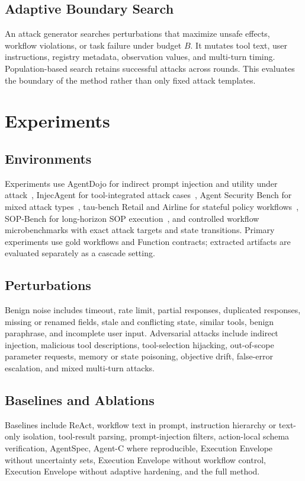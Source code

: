 \documentclass[10pt,twocolumn]{article}
\begin{document}
\subsection{Adaptive Boundary Search}
An attack generator searches perturbations that maximize unsafe effects, workflow violations, or task failure under budget $B$. It mutates tool text, user instructions, registry metadata, observation values, and multi-turn timing. Population-based search retains successful attacks across rounds. This evaluates the boundary of the method rather than only fixed attack templates.

\section{Experiments}
\subsection{Environments}
Experiments use AgentDojo for indirect prompt injection and utility under attack~\cite{debenedetti2024agentdojo}, InjecAgent for tool-integrated attack cases~\cite{zhan2024injecagent}, Agent Security Bench for mixed attack types~\cite{zhang2024asb}, tau-bench Retail and Airline for stateful policy workflows~\cite{yao2024taubench}, SOP-Bench for long-horizon SOP execution~\cite{nandi2025sopbench}, and controlled workflow microbenchmarks with exact attack targets and state transitions. Primary experiments use gold workflows and Function contracts; extracted artifacts are evaluated separately as a cascade setting.

\subsection{Perturbations}
Benign noise includes timeout, rate limit, partial responses, duplicated responses, missing or renamed fields, stale and conflicting state, similar tools, benign paraphrase, and incomplete user input. Adversarial attacks include indirect injection, malicious tool descriptions, tool-selection hijacking, out-of-scope parameter requests, memory or state poisoning, objective drift, false-error escalation, and mixed multi-turn attacks.

\subsection{Baselines and Ablations}
Baselines include ReAct, workflow text in prompt, instruction hierarchy or text-only isolation, tool-result parsing, prompt-injection filters, action-local schema verification, AgentSpec, Agent-C where reproducible, Execution Envelope without uncertainty sets, Execution Envelope without workflow control, Execution Envelope without adaptive hardening, and the full method.
\end{document}
